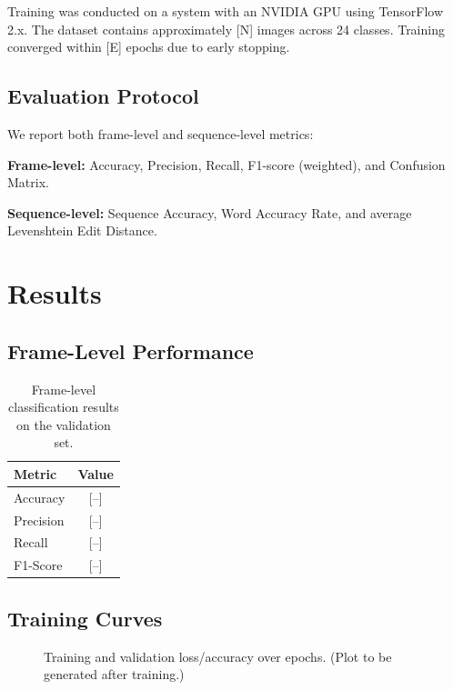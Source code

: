 \documentclass[12pt, a4paper]{article}
\begin{document}
Training was conducted on a system with an NVIDIA GPU using TensorFlow 2.x. The dataset contains approximately [N] images across 24 classes. Training converged within [E] epochs due to early stopping.

\subsection{Evaluation Protocol}

We report both frame-level and sequence-level metrics:

\textbf{Frame-level:} Accuracy, Precision, Recall, F1-score (weighted), and Confusion Matrix.

\textbf{Sequence-level:} Sequence Accuracy, Word Accuracy Rate, and average Levenshtein Edit Distance.

\section{Results}

\subsection{Frame-Level Performance}

\begin{table}[H]
\centering
\caption{Frame-level classification results on the validation set.}
\begin{tabular}{lc}
\toprule
\textbf{Metric} & \textbf{Value} \\
\midrule
Accuracy  & [--] \\
Precision & [--] \\
Recall    & [--] \\
F1-Score  & [--] \\
\bottomrule
\end{tabular}
\label{tab:frame_metrics}
\end{table}

\subsection{Training Curves}

\begin{figure}[H]
\centering
\caption{Training and validation loss/accuracy over epochs. (Plot to be generated after training.)}
\label{fig:training_curves}
\end{figure}
\end{document}
